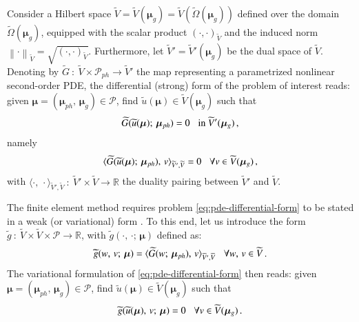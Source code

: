 \documentclass[longtitle]{elsarticle}
\numberwithin{equation}{section}
\theoremstyle{theorem}
\theoremstyle{definition}
\theoremstyle{remark}
\theoremstyle{proposition}
\numberwithin{figure}{section}
\newcommand{\norm}[1]{\left\lVert#1\right\rVert}
\newcommand{\wt}[1]{\widetilde{#1}}
\newcommand{\bg}[1]{\boldsymbol{#1}}
\begin{document}
		Consider a Hilbert space $\wt{V} = \wt{V}(\bg{\mu}_g) = \wt{V}(\wt{\Omega}(\boldsymbol{\mu}_g))$ defined over the domain $\wt{\Omega}(\boldsymbol{\mu}_g)$, equipped with the scalar product $(\cdot, \cdot)_{\wt{V}}$ and the induced norm $\norm{\cdot}_{\wt{V}} = \sqrt{(\cdot, \cdot)_{\wt{V}}}$. Furthermore, let $\wt{V}' = \wt{V}'(\boldsymbol{\mu}_g)$ be the dual space of $\wt{V}$. Denoting by $\wt{G} ~ : ~ \wt{V} \times \mathcal{P}_{ph} \rightarrow \wt{V}'$ the map representing a parametrized nonlinear second-order PDE, the differential (strong) form of the problem of interest reads: given $\bg{\mu} = (\bg{\mu}_{ph}, \, \bg{\mu}_g) \in \mathcal{P}$, find $\wt{u}(\boldsymbol{\mu}) \in \wt{V}(\bg{\mu}_g)$ such that
		\begin{equation}
			\label{eq:pde-differential-form}
			\wt{G}(\wt{u}(\bg{\mu}); \, \bg{\mu}_{ph}) = 0 \hspace*{0.3cm} \text{in $\wt{V}'(\bg{\mu}_g)$} \, ,
		\end{equation}
		namely
		\begin{equation*}
			\langle \wt{G}(\wt{u}(\bg{\mu}); \, \bg{\mu}_{ph}), \, v \rangle_{\wt{V}',\wt{V}} = 0 \hspace*{0.3cm} \forall v \in \wt{V}(\bg{\mu}_g) \, ,
		\end{equation*}
		with $\langle \cdot, \, \cdot \rangle_{\wt{V}',\wt{V}} ~ : ~ \wt{V}' \times \wt{V} \rightarrow \mathbb{R}$ the duality pairing between $\wt{V}'$ and $\wt{V}$. 		

		The finite element method requires problem \eqref{eq:pde-differential-form} to be stated in a weak (or variational) form \cite{Qua10}. To this end, let us introduce the form $\wt{g} ~ : ~ \wt{V} \times \wt{V} \times \mathcal{P} \rightarrow \mathbb{R}$, with $\wt{g}(\cdot, \, \cdot; \, \bg{\mu})$ defined as:
		\begin{equation*}
			\wt{g}(w, \, v; \, \bg{\mu}) = \langle \wt{G}(w; \, \bg{\mu}_{ph}), \, v \rangle_{\wt{V}',\wt{V}} \hspace*{0.3cm} \forall w, \, v \in \wt{V} \, .
		\end{equation*}
		The variational formulation of \eqref{eq:pde-differential-form} then reads: given $\bg{\mu} = (\bg{\mu}_{ph}, \, \bg{\mu}_g) \in \mathcal{P}$, find $\wt{u}(\bg{\mu}) \in \wt{V}(\bg{\mu}_g)$ such that
		\begin{equation*}
			\wt{g}(\wt{u}(\bg{\mu}), \, v; \, \bg{\mu}) = 0 \hspace*{0.3cm} \forall v \in \wt{V}(\bg{\mu}_g) \, .
		\end{equation*}
		
\end{document}
